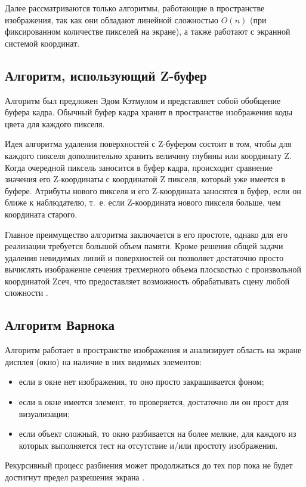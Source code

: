 Далее рассматриваются только алгоритмы, работающие в пространстве изображения, так как они обладают линейной сложностью $O(n)$ (при фиксированном количестве пикселей на экране), а также работают с экранной системой координат.

\subsection{Алгоритм, использующий Z-буфер}

Алгоритм был предложен Эдом Кэтмулом и представляет собой обобщение буфера кадра.
Обычный буфер кадра хранит в пространстве изображения коды цвета для каждого пикселя.

Идея алгоритма удаления поверхностей с Z-буфером состоит в том, чтобы для каждого пикселя дополнительно хранить величину глубины или координату Z.
Когда очередной пиксель заносится в буфер кадра, происходит сравнение значения его Z-координаты с координатой Z пикселя, который уже имеется в буфере.
Атрибуты нового пикселя и его Z-координата заносятся в буфер, если он ближе к наблюдателю, т.~е. если Z-координата нового пикселя больше, чем координата старого.

Главное преимущество алгоритма заключается в его простоте, однако для его реализации требуется большой объем памяти. 
Кроме решения общей задачи удаления невидимых линий и поверхностей он позволяет достаточно просто вычислять изображение сечения трехмерного объема плоскостью с произвольной координатой Z{сеч}, что предоставляет возможность обрабатывать сцену любой сложности \cite{base, baseOpt}.

\subsection{Алгоритм Варнока}

Алгоритм работает в пространстве изображения и анализирует область на экране дисплея (окно) на наличие в них видимых элементов:
\begin{itemize}
	\item если в окне нет изображения, то оно просто закрашивается фоном;
	\item если в окне имеется элемент, то проверяется, достаточно ли он прост для визуализации;
	\item если объект сложный, то окно разбивается на более мелкие, для каждого из которых выполняется тест на отсутствие и/или простоту изображения.
\end{itemize}
Рекурсивный процесс разбиения может продолжаться до тех пор пока не будет достигнут предел разрешения экрана \cite{invisible1}. 

